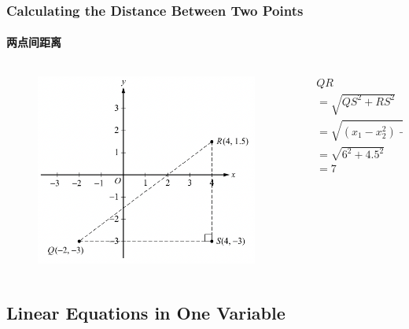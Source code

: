 \documentclass[
	11pt, %
	handout,
]{beamer}
\begin{document}
\begin{frame}
	\frametitle{Calculating the Distance Between Two Points}
	\framesubtitle{两点间距离}
	\begin{columns}[t] 
		\begin{column}{0.6\textwidth} %
			\begin{figure}
		    \includegraphics[width=\linewidth]{Distance_Between _Two_Points.png}
		 \end{figure}
		\end{column}
		\begin{column}{0.4 \textwidth} %
			\begin{equation*}
				\begin{aligned}
				&QR\\
				&= \sqrt{QS^2 + RS^2}\\
				&= \sqrt{(x_1 - x_2^2) + (y_1 + y_2)^2}\\
				&= \sqrt{6^2 + 4.5^2}\\
				&= 7\\
				\end{aligned}
			\end{equation*}

    \end{column}
	\end{columns}
\end{frame}



\subsection{Linear Equations in One Variable}
\end{document}
